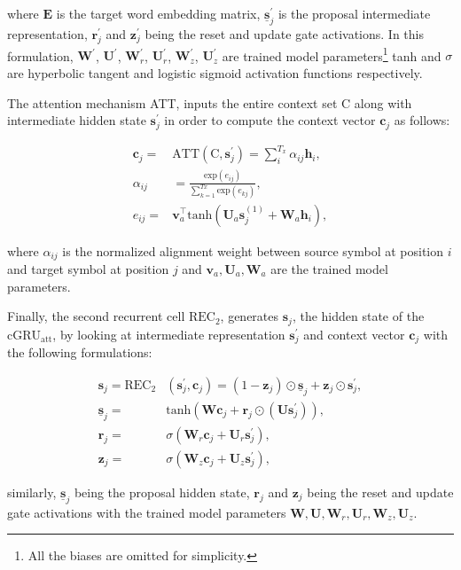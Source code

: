 \documentclass[11pt, oneside]{article}
\theoremstyle{definition}
\newcommand{\vect}[1]{\mathbf{#1}}
\newcommand{\matr}[1]{\mathbf{#1}}
\newcommand{\vc}[0]{\vect{c}}
\newcommand{\vh}[0]{\vect{h}}
\newcommand{\vv}[0]{\vect{v}}
\newcommand{\vz}[0]{\vect{z}}
\newcommand{\vs}[0]{\vect{s}}
\newcommand{\vr}[0]{\vect{r}}
\newcommand{\mW}[0]{\matr{W}}
\newcommand{\mE}[0]{\matr{E}}
\newcommand{\mU}[0]{\matr{U}}
\begin{document}
\noindent where $\mE$ is the target word embedding matrix, 
$\underline{\vs}_j^{\prime}$ is the proposal intermediate representation, $\vr_j^{\prime}$ 
and $\vz_j^{\prime}$ being the reset and update gate activations. In this formulation, 
$\mW^{\prime}$, $\mU^{\prime}$, $\mW_r^{\prime}$, $\mU_r^{\prime}$, 
$\mW_z^{\prime}$, $\mU_z^{\prime}$ are trained model parameters\footnote{All 
the biases are omitted for simplicity.} tanh and $\sigma$ are hyperbolic tangent 
and logistic sigmoid activation functions respectively.

The attention mechanism ATT, inputs the entire context set C along with 
intermediate hidden state $\vs_j^{\prime}$ in order to compute the context vector 
$\vc_j$ as follows:

\begin{align}
	\vc_j =& \text{ATT} \left(  \text{C}, \vs_j^{\prime}  \right) = \sum_i^{T_x} \alpha_{ij} \vh_i	,	\\
	 \alpha_{ij} &  = \frac{\text{exp}(e_{ij})}{\sum_{k=1}^{Tx} \text{exp}(e_{kj}) } 	,\\
	e_{ij} =& \vv_a^{\intercal} \text{tanh} \left( \mU_a \vs_j^{(1)} + \mW_a \vh_i \right) ,	
\end{align}

\noindent where $\alpha_{ij}$ is the normalized alignment weight between source 
symbol at position $i$ and target symbol at position $j$ and $\vv_a, \mU_a, \mW_a$ 
are the trained model parameters.

Finally, the second recurrent cell $\text{REC}_2$, generates $\vs_j$, the hidden state of 
the $\text{cGRU}_{\text{att}}$, by looking at intermediate representation  
$\vs_j^{\prime}$ and context vector $\vc_j$ with the following formulations:

\begin{align}
	\vs_j = \text{REC}_2 & \left(  \vs_j^{\prime}, \vc_j  \right) = (1 - \vz_j) \odot \underline{\vs}_j + \vz_j \odot \vs_j^{\prime},	 \\
	\underline{\vs}_j =& \text{tanh} \left(  \mW \vc_j  + \vr_j \odot (\mU \vs_j^{\prime} )  \right) ,\\
	\vr_j =& \sigma \left( \mW_r \vc_j + \mU_r \vs_j^{\prime} \right), \\
	\vz_j =& \sigma \left( \mW_z \vc_j + \mU_z \vs_j^{\prime} \right),
\end{align}

\noindent similarly, $\underline{\vs}_j$ being the proposal hidden state, 
$\vr_j$ and $\vz_j$ being the reset and update gate activations with the 
trained model parameters $\mW, \mU, \mW_r, \mU_r, 
\mW_z, \mU_z$.
\end{document}
